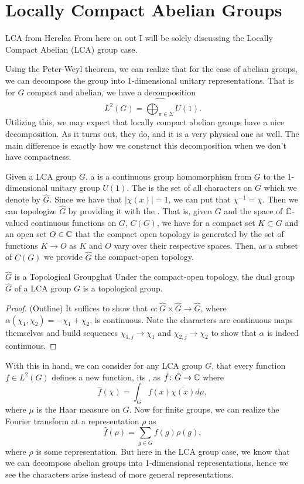 \section{Locally Compact Abelian Groups}
\begin{remark}{LCA from Here}{lca}
    From here on out I will be solely discussing the Locally Compact Abelian (LCA) group case.
\end{remark}

Using the Peter-Weyl theorem, we can realize that for the case of abelian groups, we can decompose the group into 1-dimensional unitary representations. That is for $G$ compact and abelian, we have a decomposition
\[
L^2(G)=\widehat{\bigoplus_{\pi \in \Sigma}} U(1).
\] 
Utilizing this, we may expect that locally compact abelian groups have a nice decomposition. As it turns out, they do, and it is a very physical one as well.  The main difference is exactly how we construct this decomposition when we don't have compactness. 

Given a LCA group $G$, a  is a continuous group homomorphism from $G$ to the 1-dimensional unitary group $U(1)$. The  is the set of all characters on $G$ which we denote by $\hat{G}$. Since we have that $|\chi(x)|=1$, we can put that $\chi^{-1}=\overline{\chi}$.  Then we can topologize $\hat{G}$ by providing it with the . That is, given $G$ and the space of $\mathbb{C}$-valued continuous functions on $G$, $C(G) $, we have for a compact set $K\subset G$ and an open set $O\in \mathbb{C}$ that the compact open topology is generated by the set of functions $K \to O$ as $K$ and $O$ vary over their respective spaces. Then, as a subset of $C(G)$ we provide $\hat{G}$ the compact-open topology.

\begin{thm}{$\hat{G}$ is a Topological Group}{ghat}
    Under the compact-open topology, the dual group $\hat{G}$ of a LCA group $G$ is a topological group.
    \tcblower
    \begin{proof} 
    (Outline) It suffices to show that $\alpha \colon \hat{G}\times \hat{G} \to \hat{G}$, where $\alpha(\chi_1,\chi_2)=-\chi_1+\chi_2$, is continuous. Note the characters are continuous maps themselves and build sequences $\chi_{1,j} \to \chi_1$ and $\chi_{2,j}\to \chi_2$ to show that $\alpha$ is indeed continuous.
    \end{proof}
\end{thm}

With this in hand, we can consider for any LCA group $G$, that every function $f\in L^2(G)$ defines a new function, its , as $\hat{f}\colon \hat{G}\to \mathbb{C}$ where
\[
\hat{f}(\chi)=\int_G f(x)\overline{\chi(x)}d\mu,
\]
where $\mu$ is the Haar measure on $G$.  Now for finite groups, we can realize the Fourier transform at a representation $\rho$ as
\[
\hat{f}(\rho)=\sum_{g\in G}f(g)\rho(g),
\]
where $\rho$ is some representation. But here in the LCA group case, we know that we can decompose abelian groups into 1-dimensional representations, hence we see the characters arise instead of more general representations.

